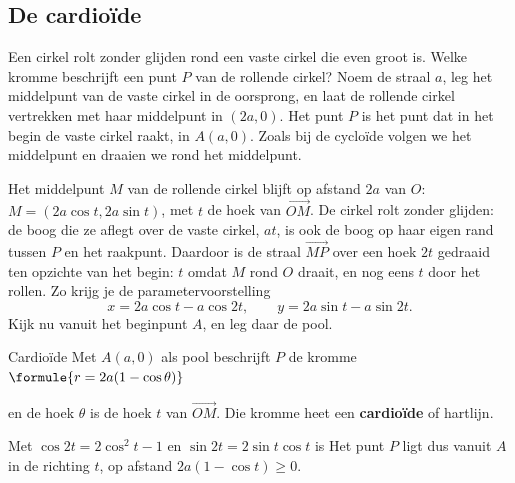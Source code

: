 
\begin{oefeningen}
\end{oefeningen}

\subsection{De cardioïde}

Een cirkel rolt zonder glijden rond een vaste cirkel die even groot is. Welke kromme beschrijft een punt $P$ van de rollende cirkel? Noem de straal $a$, leg het middelpunt van de vaste cirkel in de oorsprong, en laat de rollende cirkel vertrekken met haar middelpunt in $(2a, 0)$. Het punt $P$ is het punt dat in het begin de vaste cirkel raakt, in $A(a, 0)$. Zoals bij de cycloïde volgen we het middelpunt en draaien we rond het middelpunt.

Het middelpunt $M$ van de rollende cirkel blijft op afstand $2a$ van $O$: $M = (2a\cos t, 2a\sin t)$, met $t$ de hoek van $\overrightarrow{OM}$. De cirkel rolt zonder glijden: de boog die ze aflegt over de vaste cirkel, $at$, is ook de boog op haar eigen rand tussen $P$ en het raakpunt. Daardoor is de straal $\overrightarrow{MP}$ over een hoek $2t$ gedraaid ten opzichte van het begin: $t$ omdat $M$ rond $O$ draait, en nog eens $t$ door het rollen. Zo krijg je de parametervoorstelling
\[ x = 2a\cos t - a\cos2t, \qquad y = 2a\sin t - a\sin2t . \]
Kijk nu vanuit het beginpunt $A$, en leg daar de pool.

\begin{theorie}
\begin{stelling}{Cardioïde}
Met $A(a, 0)$ als pool beschrijft $P$ de kromme \qquad $\formule{r = 2a(1 - \cos\theta)}$

\vspace{1mm}
en de hoek $\theta$ is de hoek $t$ van $\overrightarrow{OM}$. Die kromme heet een \textbf{\textcolor{accent}{cardioïde}} of hartlijn.
\end{stelling}

\begin{bewijs}
Met $\cos2t = 2\cos^2t - 1$ en $\sin2t = 2\sin t\cos t$ is
Het punt $P$ ligt dus vanuit $A$ in de richting $t$, op afstand $2a(1 - \cos t) \geqslant 0$.
\end{bewijs}
\end{theorie}

